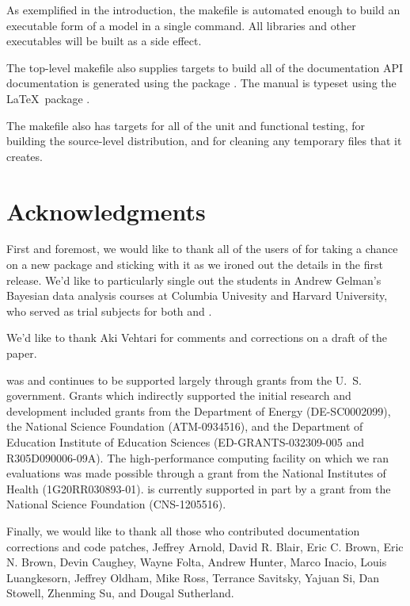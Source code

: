 \documentclass[article]{jss}
\begin{document}
As exemplified in the introduction, the makefile is automated enough
to build an executable form of a  model in a single
command.  All libraries and other executables will be built as a side
effect.  

The top-level makefile also supplies targets to build all of the
documentation  API documentation is generated using the
 package \citep{Doxygen:2011}.  The 
manual \citep{Stan:2013} is typeset using the \LaTeX\ package
\citep{MittelbachEtAl:2004}.

The makefile also has targets for all of the unit and functional
testing, for building the source-level distribution, and for cleaning
any temporary files that it creates.

\section*{Acknowledgments}

First and foremost, we would like to thank all of the users of
 for taking a chance on a new package and sticking with
it as we ironed out the details in the first release.  We'd like to
particularly single out the students in Andrew Gelman's Bayesian data
analysis courses at Columbia Univesity and Harvard University, who
served as trial subjects for both  and \citep{GelmanEtAl:2013}.

We'd like to thank Aki Vehtari for comments and corrections on a draft
of the paper.

 was and continues to be supported largely through grants from the
U.~S. government.  Grants which indirectly supported the initial
research and development included grants from the Department of Energy
(DE-SC0002099), the National Science Foundation (ATM-0934516), and the
Department of Education Institute of Education Sciences
(ED-GRANTS-032309-005 and R305D090006-09A).  The high-performance
computing facility on which we ran evaluations was made possible
through a grant from the National Institutes of Health
(1G20RR030893-01).   is currently supported in part by a grant
from the National Science Foundation (CNS-1205516).

Finally, we would like to thank all those who contributed
documentation corrections and code patches, Jeffrey Arnold, David
R. Blair, Eric C. Brown, Eric N. Brown, Devin Caughey, Wayne Folta,
Andrew Hunter, Marco Inacio, Louis Luangkesorn, Jeffrey Oldham, Mike
Ross, Terrance Savitsky, Yajuan Si, Dan Stowell, Zhenming Su, and
Dougal Sutherland.
\end{document}
